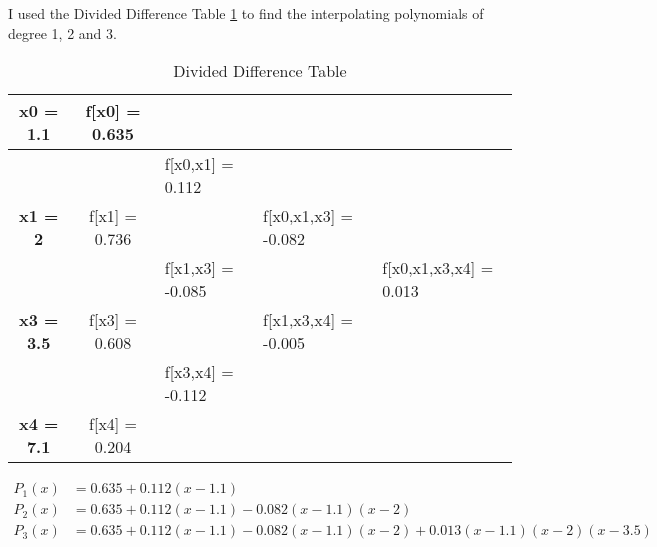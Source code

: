 \begin{answer}
    I used the Divided Difference Table \ref{tab:tab1} to find the interpolating polynomials of degree 1, 2 and 3.
    \begin{table}[H]
        \centering
        \caption{Divided Difference Table}
        \label{tab:tab1}
        \begin{tabular}{|c|c|l|l|l|}
            \hline
            \textbf{x0 = 1.1} & \cellcolor[HTML]{FFFFC7}f{[}x0{]} = 0.635 &                                              &                                                  &                                                    \\ \hline
            \textbf{}         &                                           & \cellcolor[HTML]{FFFFC7}f{[}x0,x1{]} = 0.112 &                                                  &                                                    \\ \hline
            \textbf{x1 = 2}   & f{[}x1{]} = 0.736                         &                                              & \cellcolor[HTML]{FFFFC7}f{[}x0,x1,x3{]} = -0.082 &                                                    \\ \hline
            \textbf{}         &                                           & f{[}x1,x3{]} = -0.085                        &                                                  & \cellcolor[HTML]{FFFFC7}f{[}x0,x1,x3,x4{]} = 0.013 \\ \hline
            \textbf{x3 = 3.5} & f{[}x3{]} = 0.608                         &                                              & f{[}x1,x3,x4{]} = -0.005                         &                                                    \\ \hline
            \textbf{}         &                                           & f{[}x3,x4{]} = -0.112                        &                                                  &                                                    \\ \hline
            \textbf{x4 = 7.1} & f{[}x4{]} = 0.204                         &                                              &                                                  &                                                    \\ \hline
        \end{tabular}
    \end{table}
    \begin{align}
        P_1(x) &= 0.635 + 0.112(x-1.1)\\
        P_2(x) &= 0.635 + 0.112(x-1.1) - 0.082(x-1.1)(x-2)\\
        P_3(x) &= 0.635 + 0.112(x-1.1) - 0.082(x-1.1)(x-2) + 0.013(x-1.1)(x-2)(x-3.5)
    \end{align}
\end{answer}

